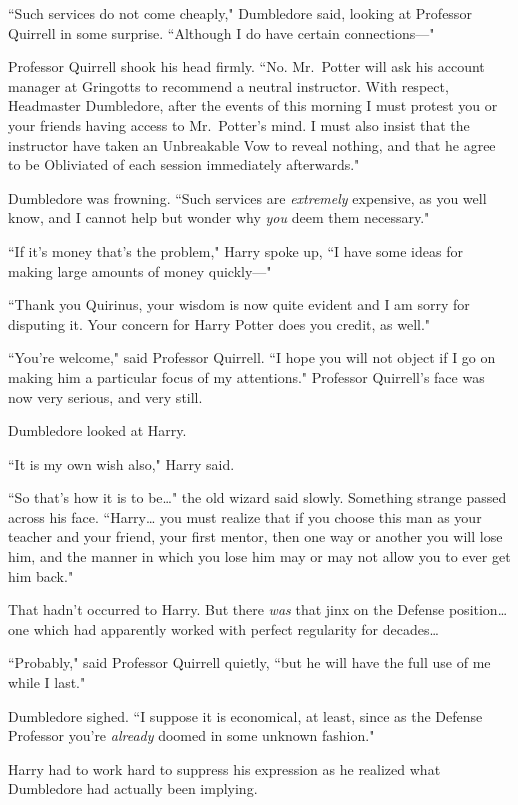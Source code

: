 ``Such services do not come cheaply," Dumbledore said, looking at Professor Quirrell in some surprise. ``Although I do have certain connections—"

Professor Quirrell shook his head firmly. ``No. Mr.~Potter will ask his account manager at Gringotts to recommend a neutral instructor. With respect, Headmaster Dumbledore, after the events of this morning I must protest you or your friends having access to Mr.~Potter's mind. I must also insist that the instructor have taken an Unbreakable Vow to reveal nothing, and that he agree to be Obliviated of each session immediately afterwards."

Dumbledore was frowning. ``Such services are \emph{extremely} expensive, as you well know, and I cannot help but wonder why \emph{you} deem them necessary."

``If it's money that's the problem," Harry spoke up, ``I have some ideas for making large amounts of money quickly—"

``Thank you Quirinus, your wisdom is now quite evident and I am sorry for disputing it. Your concern for Harry Potter does you credit, as well."

``You're welcome," said Professor Quirrell. ``I hope you will not object if I go on making him a particular focus of my attentions." Professor Quirrell's face was now very serious, and very still.

Dumbledore looked at Harry.

``It is my own wish also," Harry said.

``So that's how it is to be{\ldots}" the old wizard said slowly. Something strange passed across his face. ``Harry{\ldots} you must realize that if you choose this man as your teacher and your friend, your first mentor, then one way or another you will lose him, and the manner in which you lose him may or may not allow you to ever get him back."

That hadn't occurred to Harry. But there \emph{was} that jinx on the Defense position{\ldots} one which had apparently worked with perfect regularity for decades{\ldots}

``Probably," said Professor Quirrell quietly, ``but he will have the full use of me while I last."

Dumbledore sighed. ``I suppose it is economical, at least, since as the Defense Professor you're \emph{already} doomed in some unknown fashion."

Harry had to work hard to suppress his expression as he realized what Dumbledore had actually been implying.

